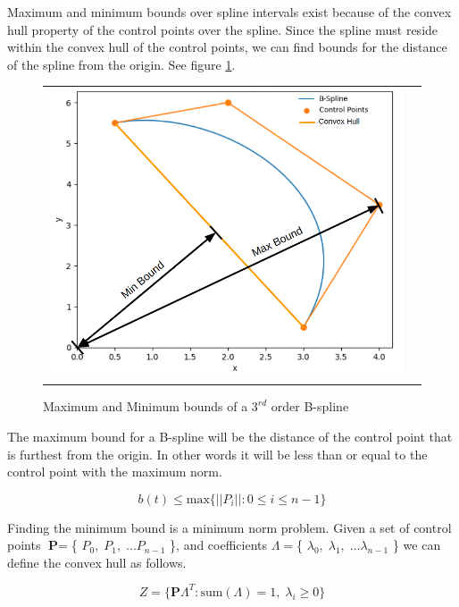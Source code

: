 \documentclass{article}
\begin{document}
    Maximum and minimum bounds over spline intervals exist because of the convex hull property of the control points over the spline. Since the spline must reside within the convex hull of the control points, we can find bounds for the distance of the spline from the origin. See figure \ref{Fig:MaxMinBounds}.
    
\begin{figure}[H]
\begin{tabular}{ll}
\includegraphics[scale=.42]{MaxMinBounds.png}
\end{tabular}
\caption{Maximum and Minimum bounds of a \(3^{rd}\) order B-spline}
\label{Fig:MaxMinBounds}
\end{figure}

    The maximum bound for a B-spline will be the distance of the control point that is furthest from the origin. In other words it will be less than or equal to the control point with the maximum norm.

    \begin{equation}
        b(t) \leq \text{max} \{||P_i|| : 0 \leq i \leq n-1\}
    \end{equation}
    
Finding the minimum bound is a minimum norm problem. Given a set of control points \(\textbf{P} = \)\{ \(P_0, \; P_1, \; ... P_{n-1}\) \}, and coefficients \(\Lambda = \)\{ \(\lambda_0, \; \lambda_1, \; ... \lambda_{n-1}\) \} we can define the convex hull as follows.

\begin{equation}
    Z = \{ \textbf{P} \Lambda^{T} : \text{sum}(\Lambda) = 1,\; \lambda_{i} \geq 0\}
\end{equation}
\end{document}
